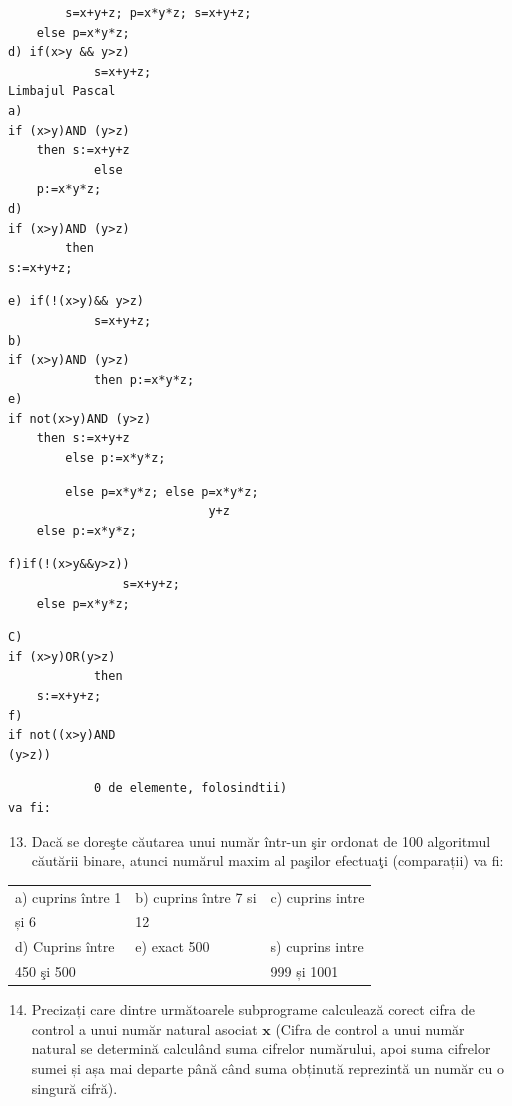 \documentclass[10pt]{article}
\begin{document}
\begin{verbatim}
        s=x+y+z; p=x*y*z; s=x+y+z;
    else p=x*y*z;
d) if(x>y && y>z)
            s=x+y+z;
Limbajul Pascal
a)
if (x>y)AND (y>z)
    then s:=x+y+z
            else
    p:=x*y*z;
d)
if (x>y)AND (y>z)
        then
s:=x+y+z;
\end{verbatim}

\begin{verbatim}
e) if(!(x>y)&& y>z)
            s=x+y+z;
b)
if (x>y)AND (y>z)
            then p:=x*y*z;
e)
if not(x>y)AND (y>z)
    then s:=x+y+z
        else p:=x*y*z;
\end{verbatim}

\begin{verbatim}
        else p=x*y*z; else p=x*y*z;
                            y+z
    else p:=x*y*z;
\end{verbatim}

\begin{verbatim}
f)if(!(x>y&&y>z))
                s=x+y+z;
    else p=x*y*z;
\end{verbatim}

\begin{verbatim}
C)
if (x>y)OR(y>z)
            then
    s:=x+y+z;
f)
if not((x>y)AND
(y>z))
\end{verbatim}

\begin{verbatim}
            0 de elemente, folosindtii)
va fi:
\end{verbatim}

\begin{enumerate}
  \setcounter{enumi}{12}
  \item Dacă se doreşte căutarea unui număr într-un şir ordonat de 100 algoritmul căutării binare, atunci numărul maxim al paşilor efectuaţi (comparații) va fi:
\end{enumerate}

\begin{center}
\begin{tabular}{lll}
a) cuprins între 1 & b) cuprins între 7 si & c) cuprins intre \\
și 6 & 12 &  \\
d) Cuprins între & e) exact 500 & s) cuprins intre \\
450 şi 500 &  & 999 și 1001 \\
\end{tabular}
\end{center}

\begin{enumerate}
  \setcounter{enumi}{13}
  \item Precizați care dintre următoarele subprograme calculează corect cifra de control a unui număr natural asociat $\mathbf{x}$ (Cifra de control a unui număr natural se determină calculând suma cifrelor numărului, apoi suma cifrelor sumei și așa mai departe până când suma obținută reprezintă un număr cu o singură cifră).
\end{enumerate}
\end{document}
